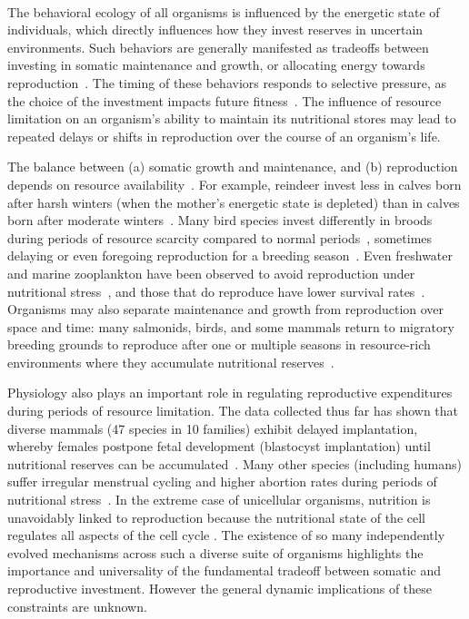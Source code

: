 \documentclass{pnastwo}
\begin{document}
\begin{article}
\vspace{2mm}

 \\
The behavioral ecology of all organisms is influenced by the energetic state of individuals, which directly influences how they invest reserves in uncertain environments.
Such behaviors are generally manifested as tradeoffs between investing in somatic maintenance and growth, or allocating energy towards reproduction~\cite{Martin:1987dl,Kirk:1997cc,Kempes:2012hy}.
The timing of these behaviors responds to selective pressure, as the choice of the investment impacts future fitness~\cite{Mangel:1988uaa,Mangel:2014kz,Yeakel:2013hi}.
The influence of resource limitation on an organism's ability to maintain its nutritional stores may lead to repeated delays or shifts in reproduction over the course of an organism's life.

The balance between (a) somatic growth and maintenance, and (b) reproduction depends on resource availability~\cite{Morris:1987eo}.
For example, reindeer invest less in calves born after harsh winters (when the mother's energetic state is depleted) than in calves born after moderate winters~\cite{Tveraa:2003fq}.
Many bird species invest differently in broods during periods of resource scarcity compared to normal periods~\cite{Daan:1988va,Jacot:2009dv}, sometimes delaying or even foregoing reproduction for a breeding season~\cite{Martin:1987dl,Stearns:1989ip,Barboza:2002in}.
Even freshwater and marine zooplankton have been observed to avoid reproduction under nutritional stress~\cite{Threlkeld:1976ih}, and those that do reproduce have lower survival rates~\cite{Kirk:1997cc}.
Organisms may also separate maintenance and growth from reproduction over space and time: many salmonids, birds, and some mammals return to migratory breeding grounds to reproduce after one or multiple seasons in resource-rich environments where they accumulate nutritional reserves~\cite{Weber:1998jg,Mduma:1999cp,Moore:2014hi}.

Physiology also plays an important role in regulating reproductive expenditures during periods of resource limitation.
The data collected thus far has shown that diverse mammals (47 species in 10 families) exhibit delayed implantation, whereby females postpone fetal development (blastocyst implantation) until nutritional reserves can be accumulated~\cite{Mead:1989dt,Sandell:1990kw}.
Many other species (including humans) suffer irregular menstrual cycling and higher abortion rates during periods of nutritional stress~\cite{Bulik:1999eo,Trites:2003cc}.
In the extreme case of unicellular organisms, nutrition is unavoidably linked to reproduction because the nutritional state of the cell regulates all aspects of the cell cycle \cite{Glazier:2009hq}.
The existence of so many independently evolved mechanisms across such a diverse suite of organisms highlights the importance and universality of the fundamental tradeoff between somatic and reproductive investment.
However the general dynamic implications of these constraints are unknown.


\end{article}
\end{document}
